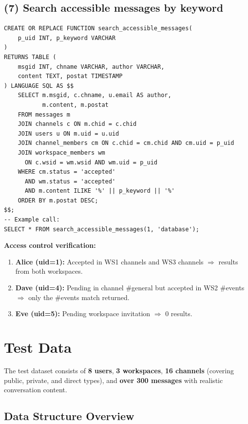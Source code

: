 \documentclass[11pt]{article}
\begin{document}
\subsection{(7) Search accessible messages by keyword}

\begin{lstlisting}
CREATE OR REPLACE FUNCTION search_accessible_messages(
    p_uid INT, p_keyword VARCHAR
)
RETURNS TABLE (
    msgid INT, chname VARCHAR, author VARCHAR,
    content TEXT, postat TIMESTAMP
) LANGUAGE SQL AS $$
    SELECT m.msgid, c.chname, u.email AS author,
           m.content, m.postat
    FROM messages m
    JOIN channels c ON m.chid = c.chid
    JOIN users u ON m.uid = u.uid
    JOIN channel_members cm ON c.chid = cm.chid AND cm.uid = p_uid
    JOIN workspace_members wm
      ON c.wsid = wm.wsid AND wm.uid = p_uid
    WHERE cm.status = 'accepted'
      AND wm.status = 'accepted'
      AND m.content ILIKE '%' || p_keyword || '%'
    ORDER BY m.postat DESC;
$$;
-- Example call:
SELECT * FROM search_accessible_messages(1, 'database');
\end{lstlisting}

\noindent\textbf{Access control verification:}
\begin{enumerate}
    \item \textbf{Alice (uid=1):} Accepted in WS1 channels and WS3 channels $\Rightarrow$ results from both workspaces. \checkmark
    \item \textbf{Dave (uid=4):} Pending in channel \#general but accepted in WS2 \#events $\Rightarrow$ only the \#events match returned. \checkmark
    \item \textbf{Eve (uid=5):} Pending workspace invitation $\Rightarrow$ 0 results. \checkmark
\end{enumerate}

\newpage
\section{Test Data}
\label{sec:testdata}

The test dataset consists of \textbf{8 users}, \textbf{3 workspaces}, \textbf{16 channels} (covering public, private, and direct types), and \textbf{over 300 messages} with realistic conversation content.

\subsection{Data Structure Overview}
\end{document}
